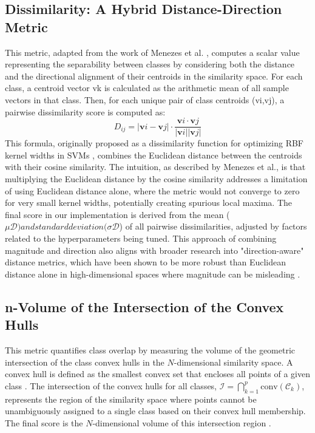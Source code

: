 \documentclass[conference]{IEEEtran}
\begin{document}
\subsection{Dissimilarity: A Hybrid Distance-Direction Metric}
This metric, adapted from the work of Menezes et al. \cite{b72}, computes a scalar value representing the separability between classes by considering both the distance and the directional alignment of their centroids in the similarity space. For each class, a centroid vector vk is calculated as the arithmetic mean of all sample vectors in that class. Then, for each unique pair of class centroids (vi,vj), a pairwise dissimilarity score is computed as:
\begin{equation}
D_{ij} = |\mathbf{v}i - \mathbf{v}j|
\cdot \frac{\mathbf{v}i \cdot \mathbf{v}j}{|\mathbf{v}i| |\mathbf{v}j|}
\end{equation}
This formula, originally proposed as a dissimilarity function for optimizing RBF kernel widths in SVMs \cite{b72}, combines the Euclidean distance between the centroids with their cosine similarity. The intuition, as described by Menezes et al., is that multiplying the Euclidean distance by the cosine similarity addresses a limitation of using Euclidean distance alone, where the metric would not converge to zero for very small kernel widths, potentially creating spurious local maxima. The final score in our implementation is derived from the mean ($\mu{\mathcal{D}})andstandarddeviation(\sigma{\mathcal{D}}$) of all pairwise dissimilarities, adjusted by factors related to the hyperparameters being tuned. This approach of combining magnitude and direction also aligns with broader research into "direction-aware" distance metrics, which have been shown to be more robust than Euclidean distance alone in high-dimensional spaces where magnitude can be misleading \cite{b23, b24, b25}.

\subsection{n-Volume of the Intersection of the Convex Hulls}
This metric quantifies class overlap by measuring the volume of the geometric intersection of the class convex hulls in the $N$-dimensional similarity space. A convex hull is defined as the smallest convex set that encloses all points of a given class \cite{b26}. The intersection of the convex hulls for all classes, $\mathcal{I} = \bigcap_{k=1}^{p} \text{conv}(\mathcal{C}_k)$, represents the region of the similarity space where points cannot be unambiguously assigned to a single class based on their convex hull membership. The final score is the $N$-dimensional volume of this intersection region \cite{b20}.
\end{document}
